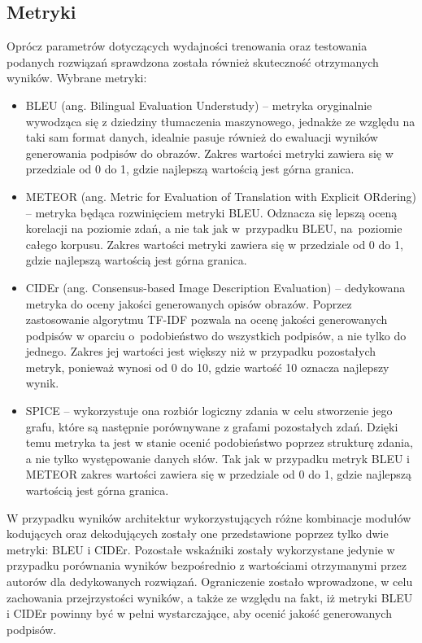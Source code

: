 \subsection{Metryki}
Oprócz parametrów dotyczących wydajności trenowania oraz testowania podanych rozwiązań sprawdzona została również skuteczność otrzymanych wyników. Wybrane metryki:
\begin{itemize}
    \item BLEU (ang. Bilingual Evaluation Understudy) \cite{bleu} -- metryka oryginalnie wywodząca się z dziedziny tłumaczenia maszynowego, jednakże ze względu na taki sam format danych, idealnie pasuje również do ewaluacji wyników generowania podpisów do obrazów. Zakres wartości metryki zawiera się w przedziale od 0 do 1, gdzie najlepszą wartością jest górna granica. %
    \item METEOR (ang. Metric for Evaluation of Translation with Explicit ORdering) \cite{meteor} -- metryka będąca rozwinięciem metryki BLEU. Odznacza się lepszą oceną korelacji na poziomie zdań, a nie tak jak w~przypadku BLEU, na~poziomie całego korpusu. Zakres wartości metryki zawiera się w przedziale od 0 do 1, gdzie najlepszą wartością jest górna granica.
    \item CIDEr (ang. Consensus-based Image Description Evaluation) \cite{cider} -- dedykowana metryka do oceny jakości generowanych opisów obrazów. Poprzez zastosowanie algorytmu TF-IDF \cite{tfidf} pozwala na ocenę jakości generowanych podpisów w oparciu o~podobieństwo do wszystkich podpisów, a nie tylko do jednego. Zakres jej wartości jest większy niż w przypadku pozostałych metryk, ponieważ wynosi od 0 do 10, gdzie wartość 10 oznacza najlepszy wynik.
    \item SPICE -- wykorzystuje ona rozbiór logiczny zdania w celu stworzenie jego grafu, które są następnie porównywane z grafami pozostałych zdań. Dzięki temu metryka ta jest w stanie ocenić podobieństwo poprzez strukturę zdania, a nie tylko występowanie danych słów. Tak jak w przypadku metryk BLEU i METEOR zakres wartości zawiera się w przedziale od 0 do 1, gdzie najlepszą wartością jest górna granica.
\end{itemize}
W przypadku wyników architektur wykorzystujących różne kombinacje modułów kodujących oraz dekodujących zostały one przedstawione poprzez tylko dwie metryki: BLEU i CIDEr. Pozostałe wskaźniki zostały wykorzystane jedynie w przypadku porównania wyników bezpośrednio z wartościami otrzymanymi przez autorów dla dedykowanych rozwiązań. Ograniczenie zostało wprowadzone, w celu zachowania przejrzystości wyników, a także ze względu na fakt, iż metryki BLEU i CIDEr powinny być w pełni wystarczające, aby ocenić jakość generowanych podpisów.
